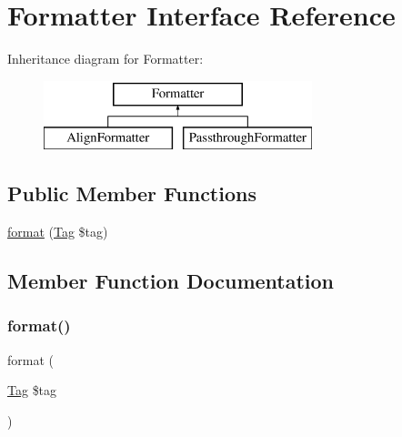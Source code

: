 \hypertarget{interfacephp_documentor_1_1_reflection_1_1_doc_block_1_1_tags_1_1_formatter}{}\section{Formatter Interface Reference}
\label{interfacephp_documentor_1_1_reflection_1_1_doc_block_1_1_tags_1_1_formatter}
Inheritance diagram for Formatter\+:\begin{figure}[H]
\begin{center}
\leavevmode
\includegraphics[height=2.000000cm]{interfacephp_documentor_1_1_reflection_1_1_doc_block_1_1_tags_1_1_formatter}
\end{center}
\end{figure}
\subsection*{Public Member Functions}
\begin{DoxyCompactItemize}
\item 
\mbox{\hyperlink{interfacephp_documentor_1_1_reflection_1_1_doc_block_1_1_tags_1_1_formatter_a237fc645f9f13d476abbb368c53b64d0}{format}} (\mbox{\hyperlink{interfacephp_documentor_1_1_reflection_1_1_doc_block_1_1_tag}{Tag}} \$tag)
\end{DoxyCompactItemize}


\subsection{Member Function Documentation}
\mbox{\label{interfacephp_documentor_1_1_reflection_1_1_doc_block_1_1_tags_1_1_formatter_a237fc645f9f13d476abbb368c53b64d0}} 
\subsubsection{\texorpdfstring{format()}{format()}}
{\footnotesize\ttfamily format (\begin{DoxyParamCaption}\item[{\mbox{\hyperlink{interfacephp_documentor_1_1_reflection_1_1_doc_block_1_1_tag}{Tag}}}]{\$tag }\end{DoxyParamCaption})}


